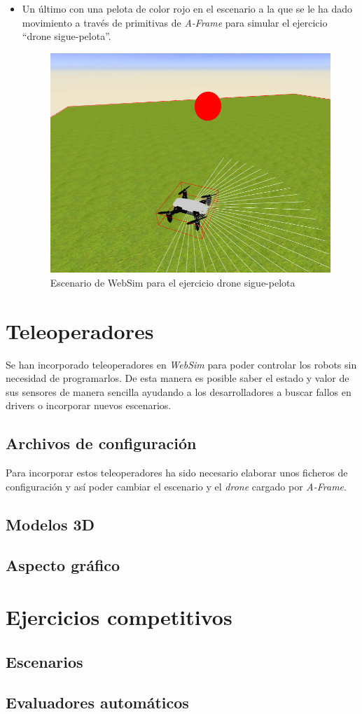 \begin{itemize}
    \item Un último con una pelota de color rojo en el escenario a la que se le ha dado movimiento a través de primitivas de \textit{A-Frame} para simular el ejercicio ``drone sigue-pelota''.
    \begin{figure}[H]
    \centering
    \includegraphics[scale=0.4]{img/droneBall.png}
    \caption{Escenario de WebSim para el ejercicio drone sigue-pelota} \label{fig:droneBall}
    \end{figure}
\end{itemize} 

\section{Teleoperadores}
Se han incorporado teleoperadores en \textit{WebSim} para poder controlar los robots sin necesidad de programarlos. De esta manera es posible saber el estado y valor de sus sensores de manera sencilla ayudando a los desarrolladores a buscar fallos en drivers o incorporar nuevos escenarios. 
\subsection{Archivos de configuración}

Para incorporar estos teleoperadores ha sido necesario elaborar unos ficheros de configuración y así poder cambiar el escenario y el \textit{drone} cargado por \textit{A-Frame}. \newline

\subsection{Modelos 3D}
\subsection{Aspecto gráfico}
\section{Ejercicios competitivos}
\subsection{Escenarios}
\subsection{Evaluadores automáticos}